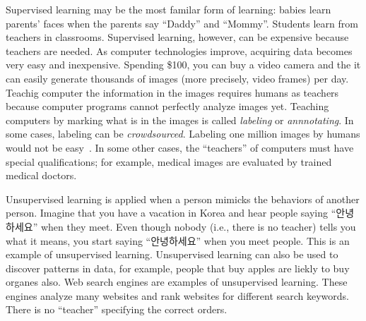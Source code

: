 

Supervised learning may be the most familar form of learning: babies
learn parents' faces when the parents say ``Daddy'' and ``Mommy''.
Students learn from teachers in classrooms.  Supervised learning,
however, can be expensive because teachers are needed.  As computer
technologies improve, acquiring data becomes very easy and
inexpensive.  Spending \$100, you can buy a video camera and the it
can easily generate thousands of images (more precisely, video frames)
per day. Teachig computer the information in the images requires
humans as teachers because computer programs cannot perfectly analyze
images yet.  Teaching computers by marking what is in the images is
called {\it labeling} or {\it annnotating}.  In some cases, labeling
can be {\it crowdsourced}.  Labeling one million images by humans
would not be easy~\cite{Russakovsky2015ImageNetLargeScale211252}.
 In some other cases, the ``teachers'' of
computers must have special qualifications; for example, medical
images are evaluated by trained medical doctors.

Unsupervised learning is applied when a person mimicks the behaviors
of another person.  Imagine that you have a vacation in Korea and hear
people saying ``안녕하세요'' when they meet.  Even though nobody
(i.e., there is no teacher) tells you what it means, you start saying
``안녕하세요'' when you meet people.  This is an example of
unsupervised learning.  Unsupervised learning can also be used to
discover patterns in data, for example, people that buy apples are
liekly to buy organes also.  Web search engines are examples of
unsupervised learning.  These engines analyze many websites and rank
websites for different search keywords. There is no ``teacher''
specifying the correct orders.


 


\begin{comment}
\vspace{0.1in}
\begin{table}
  \caption{Four types of learning}
  \begin{tabular}{p{1in}p{1in}p{1in}p{1in}p{1in}}
    &    {\bf Supervised} & {\bf Unsupervised} & {\bf Reinforcement} & {\bf Transfer}\\
    \hline
    Teacher & Yes & No & No \\
    Correct Answer & Yes & No & No \\
    Consider Sequences & No & No & Yes \\
    Applications & Answer Yes/No & Cluster data & Develop strategies \\
  \end{tabular}

  \label{table:threetypesoflearning}
\end{table}
\vspace{0.1in}

\end{comment}

